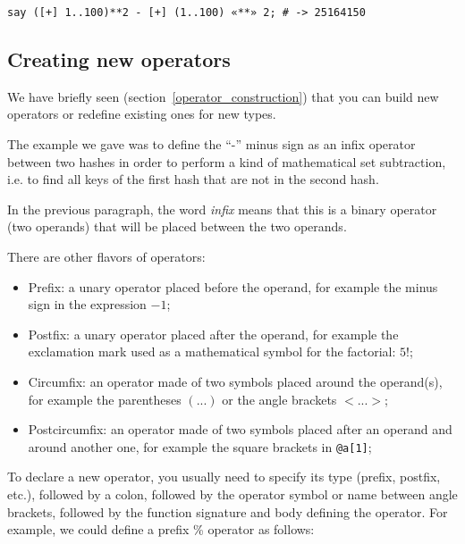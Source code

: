 \begin{verbatim}
say ([+] 1..100)**2 - [+] (1..100) «**» 2; # -> 25164150
\end{verbatim}

\subsection{Creating new operators}

We have briefly seen (section~\ref{operator_construction}) 
that you can build new operators or redefine existing ones 
for new types.

The example we gave was to define the ``-'' minus sign 
as an infix operator between two hashes in order to 
perform a kind of mathematical set subtraction, i.e. 
to find all keys of the first hash that are not in the 
second hash.

In the previous paragraph, the word \emph{infix} means 
that this is a binary operator (two operands) that will 
be placed between the two operands. 

There are other flavors of operators:
\begin{itemize}
\item Prefix: a unary operator placed before the operand, 
for example the minus sign in the expression $-1$;

\item Postfix: a unary operator placed after the operand, 
for example the exclamation mark used as a mathematical  
symbol for the factorial: $5!$;

\item Circumfix: an operator made of two symbols placed 
around the operand(s), for example the parentheses $(...)$ 
or the angle brackets $<...>$;

\item Postcircumfix: an operator made of two symbols placed 
after an operand and around another one, for example the 
square brackets in \verb'@a[1]';
\end{itemize}

To declare a new operator, you usually need to specify 
its type (prefix, postfix, etc.), followed by a colon, 
followed by the operator symbol or name between angle brackets, 
followed by the function signature and body defining 
the operator. For example, we could define a prefix \% 
operator as follows:

